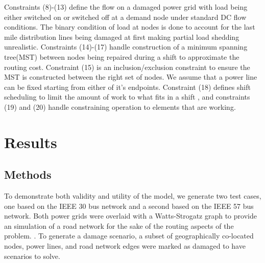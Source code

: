 \documentclass[10pt]{article}
\begin{document}
 Constraints (8)-(13) define the flow on a damaged power grid with load being either switched on or switched off at a demand node under standard DC flow conditions. The binary condition of load at nodes is done to account for the last mile distribution lines being damaged at first making partial load shedding unrealistic. Constraints (14)-(17) handle construction of a minimum spanning tree(MST) between nodes being repaired during a shift to approximate the routing cost. Constraint (15) is an inclusion/exclusion constraint to ensure the MST is constructed between the right set of nodes. We assume that a power line can be fixed starting from either of it's endpoints. Constraint (18) defines shift scheduling to limit the amount of work to what fits in a shift , and constraints (19) and (20) handle constraining operation to elements that are working.
\section{\large{Results}}
\vspace*{-12pt}
\subsection{Methods}
 \vspace*{-12pt}
 
 To demonstrate both validity and utility of the model, we generate two test cases, one based on the IEEE 30 bus network and a second based on the IEEE 57 bus network. Both power grids were overlaid with a Watts-Strogatz graph to provide an simulation of a road network for the sake of the routing aspects of the problem. \cite{Watts1998} \cite{Newman2002}. To generate a damage scenario, a subset of geographically co-located nodes, power lines, and road network edges were marked as damaged to have scenarios to solve.
 
\end{document}
